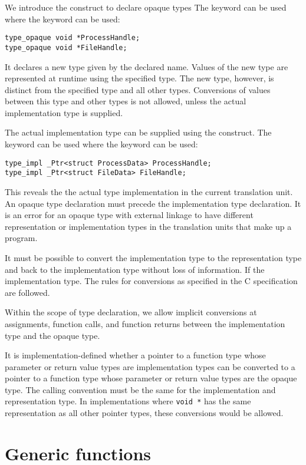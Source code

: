 We introduce the  construct to declare 
opaque types  The keyword  can be used
where the keyword  can be used:
\begin{lstlisting}
type_opaque void *ProcessHandle;
type_opaque void *FileHandle;
\end{lstlisting}
It declares a new type given by the declared name.  
Values of the new type are represented at runtime using the specified type.
The new type, however, is distinct from the specified type and all other types.
Conversions of values between this type and other types is not allowed, unless the actual
implementation type is supplied.   

The actual implementation type can be supplied using the 
construct.   The keyword  can be used where the
keyword  can be used:
\begin{lstlisting}
type_impl _Ptr<struct ProcessData> ProcessHandle;
type_impl _Ptr<struct FileData> FileHandle;
\end{lstlisting}
This reveals the the actual type implementation in the current translation
unit.  An opaque type declaration must precede the implementation type
declaration.   It is an error for an opaque type with external linkage to have
different representation or implementation types in the translation units that make up a
program.

It must be possible to convert the implementation type to the representation
type and back to the implementation type without loss of information.  
If the implementation type.  The rules for conversions as specified in
the C specification are followed.

Within the scope of type  declaration, we allow
implicit conversions at assignments, function calls, and function returns
between the implementation type and the opaque type.

It is implementation-defined whether a pointer to a function type whose
parameter or return value types are implementation types can be converted
to a pointer to a function type whose parameter or return value types
are the opaque type.  The calling convention must be the same for
the implementation and representation type.
In implementations where \lstinline+void *+ has the same representation
as all other pointer types, these conversions would be allowed.

\section{Generic functions}
\label{sec:functions}

